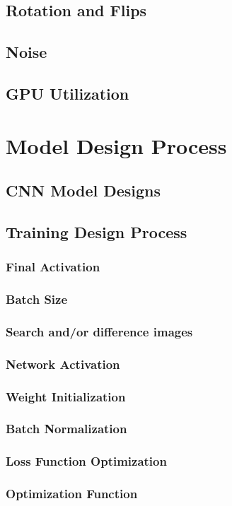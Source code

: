   \subsection{Rotation and Flips}
  \subsection{Noise}
  \subsection{GPU Utilization}
\section{Model Design Process}
  \subsection{CNN Model Designs}
  \subsection{Training Design Process}
    \subsubsection{Final Activation}
    \subsubsection{Batch Size}
    \subsubsection{Search and/or difference images}
    \subsubsection{Network Activation}
    \subsubsection{Weight Initialization}
    \subsubsection{Batch Normalization}
    \subsubsection{Loss Function Optimization}
    \subsubsection{Optimization Function}
